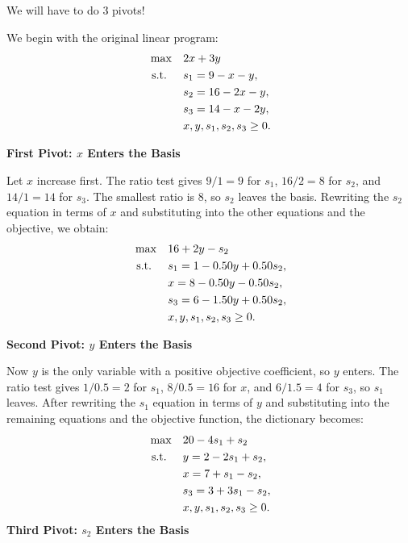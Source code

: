 \begin{solution}
We will have to do 3 pivots!

We begin with the original linear program:
\[
\begin{aligned}
\max\quad & 2x + 3y \\
\mbox{ s.t. }\quad & s_1 = 9 - x - y, \\
                        & s_2 = 16 - 2x - y, \\
                        & s_3 = 14 - x - 2y, \\
                        & x, y, s_1, s_2, s_3 \ge 0.
\end{aligned}
\]

\textbf{First Pivot: \(x\) Enters the Basis}

Let \(x\) increase first. The ratio test gives \(9/1 = 9\) for \(s_1\), \(16/2 = 8\) for \(s_2\), and \(14/1 = 14\) for \(s_3\). The smallest ratio is \(8\), so \(s_2\) leaves the basis. Rewriting the \(s_2\) equation in terms of \(x\) and substituting into the other equations and the objective, we obtain:
\[
\begin{aligned}
\max\quad & 16 + 2y - s_2 \\
\mbox{ s.t. }\quad & s_1 = 1 - 0.50y + 0.50s_2, \\
                        & x = 8 - 0.50y - 0.50s_2, \\
                        & s_3 = 6 - 1.50y + 0.50s_2, \\
                        & x, y, s_1, s_2, s_3 \ge 0.
\end{aligned}
\]

\textbf{Second Pivot: \(y\) Enters the Basis}

Now \(y\) is the only variable with a positive objective coefficient, so \(y\) enters. The ratio test gives \(1/0.5 = 2\) for \(s_1\), \(8/0.5 = 16\) for \(x\), and \(6/1.5 = 4\) for \(s_3\), so \(s_1\) leaves. After rewriting the \(s_1\) equation in terms of \(y\) and substituting into the remaining equations and the objective function, the dictionary becomes:
\[
\begin{aligned}
\max\quad & 20 - 4s_1 + s_2 \\
\mbox{ s.t. }\quad & y = 2 - 2s_1 + s_2, \\
                        & x = 7 + s_1 - s_2, \\
                        & s_3 = 3 + 3s_1 - s_2, \\
                        & x, y, s_1, s_2, s_3 \ge 0.
\end{aligned}
\]
\textbf{Third Pivot: \(s_2\) Enters the Basis}


\end{solution}
